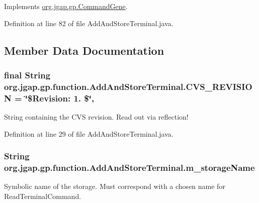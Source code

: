 Implements \hyperlink{classorg_1_1jgap_1_1gp_1_1_command_gene_a236141d99059da808afe7a9217e411c7}{org.\-jgap.\-gp.\-Command\-Gene}.



Definition at line 82 of file Add\-And\-Store\-Terminal.\-java.



\subsection{Member Data Documentation}
\hypertarget{classorg_1_1jgap_1_1gp_1_1function_1_1_add_and_store_terminal_add1d1d7649a010682468ac5adf7e3d6e}{
\subsubsection[{C\-V\-S\-\_\-\-R\-E\-V\-I\-S\-I\-O\-N}]{\setlength{\rightskip}{0pt plus 5cm}final String org.\-jgap.\-gp.\-function.\-Add\-And\-Store\-Terminal.\-C\-V\-S\-\_\-\-R\-E\-V\-I\-S\-I\-O\-N = \char`\"{}\$Revision\-: 1. \$\char`\"{}\hspace{0.3cm}{\ttfamily [static]}, {\ttfamily [private]}}}\label{classorg_1_1jgap_1_1gp_1_1function_1_1_add_and_store_terminal_add1d1d7649a010682468ac5adf7e3d6e}
String containing the C\-V\-S revision. Read out via reflection! 

Definition at line 29 of file Add\-And\-Store\-Terminal.\-java.

\hypertarget{classorg_1_1jgap_1_1gp_1_1function_1_1_add_and_store_terminal_ad4d924dec40c6808079bba21c2ce7109}{
\subsubsection[{m\-\_\-storage\-Name}]{\setlength{\rightskip}{0pt plus 5cm}String org.\-jgap.\-gp.\-function.\-Add\-And\-Store\-Terminal.\-m\-\_\-storage\-Name\hspace{0.3cm}{\ttfamily [private]}}}\label{classorg_1_1jgap_1_1gp_1_1function_1_1_add_and_store_terminal_ad4d924dec40c6808079bba21c2ce7109}
Symbolic name of the storage. Must correspond with a chosen name for Read\-Terminal\-Command. 

